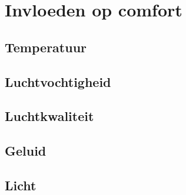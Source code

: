 
\section{Invloeden op comfort} \label{sec:theory}

\subsection{Temperatuur}
\subsection{Luchtvochtigheid}
\subsection{Luchtkwaliteit}
\subsection{Geluid}
\subsection{Licht}



